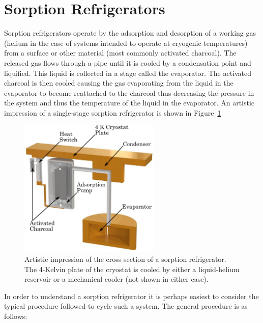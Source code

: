 \section{Sorption Refrigerators}\label{sec:sorptionRefrigerators}
Sorption refrigerators operate by the adsorption and desorption of a working gas (helium in the case of systems intended to operate at cryogenic temperatures) from a surface or other material (most commonly activated charcoal). The released gas flows through a pipe until it is cooled by a condensation point and liquified. This liquid is collected in a stage called the evaporator. The activated charcoal is then cooled causing the gas evaporating from the liquid in the evaporator to become reattached to the charcoal thus decreasing the pressure in the system and thus the temperature of the liquid in the evaporator. An artistic impression of a single-stage sorption refrigerator is shown in Figure~\ref{fig:sorptionPumpCrossSec}
\begin{figure}[tb]
\begin{center}
\includegraphics[width = 0.6\textwidth]{figures/sorptionPump.pdf}
\caption[Artistic impression of the cross section of a sorption refrigerator]{Artistic impression of the cross section of a sorption refrigerator. The 4-Kelvin plate of the cryostat is cooled by either a liquid-helium reservoir or a mechanical cooler (not shown in either case).}
\label{fig:sorptionPumpCrossSec}
\end{center}
\end{figure}
\par 
In order to understand a sorption refrigerator it is perhaps easiest to consider the typical procedure followed to cycle such a system. The general procedure is as follows:
